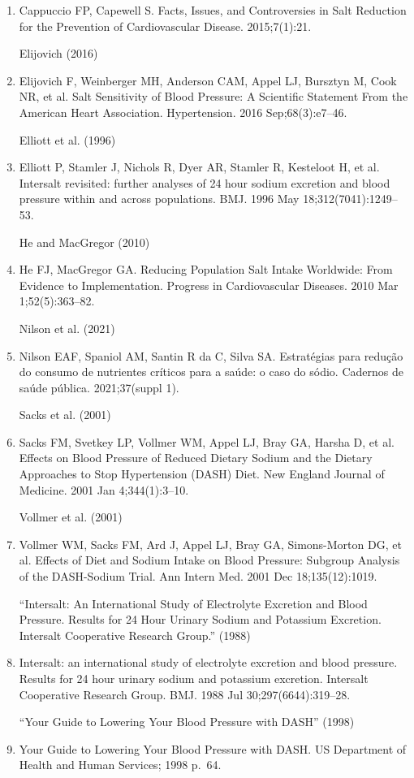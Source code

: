 \documentclass[
]{article}
\begin{document}
\begin{enumerate}
\def\labelenumi{\arabic{enumi}.}
\item
  Cappuccio FP, Capewell S. Facts, Issues, and Controversies in Salt
  Reduction for the Prevention of Cardiovascular Disease. 2015;7(1):21.

  Elijovich (2016)
\item
  Elijovich F, Weinberger MH, Anderson CAM, Appel LJ, Bursztyn M, Cook
  NR, et al. Salt Sensitivity of Blood Pressure: A Scientific Statement
  From the American Heart Association. Hypertension. 2016
  Sep;68(3):e7--46.

  Elliott et al. (1996)
\item
  Elliott P, Stamler J, Nichols R, Dyer AR, Stamler R, Kesteloot H, et
  al. Intersalt revisited: further analyses of 24 hour sodium excretion
  and blood pressure within and across populations. BMJ. 1996 May
  18;312(7041):1249--53.

  He and MacGregor (2010)
\item
  He FJ, MacGregor GA. Reducing Population Salt Intake Worldwide: From
  Evidence to Implementation. Progress in Cardiovascular Diseases. 2010
  Mar 1;52(5):363--82.

  Nilson et al. (2021)
\item
  Nilson EAF, Spaniol AM, Santin R da C, Silva SA. Estratégias para
  redução do consumo de nutrientes críticos para a saúde: o caso do
  sódio. Cadernos de saúde pública. 2021;37(suppl 1).

  Sacks et al. (2001)
\item
  Sacks FM, Svetkey LP, Vollmer WM, Appel LJ, Bray GA, Harsha D, et al.
  Effects on Blood Pressure of Reduced Dietary Sodium and the Dietary
  Approaches to Stop Hypertension (DASH) Diet. New England Journal of
  Medicine. 2001 Jan 4;344(1):3--10.

  Vollmer et al. (2001)
\item
  Vollmer WM, Sacks FM, Ard J, Appel LJ, Bray GA, Simons-Morton DG, et
  al. Effects of Diet and Sodium Intake on Blood Pressure: Subgroup
  Analysis of the DASH-Sodium Trial. Ann Intern Med. 2001 Dec
  18;135(12):1019.

  {``Intersalt: An International Study of Electrolyte Excretion and
  Blood Pressure. Results for 24 Hour Urinary Sodium and Potassium
  Excretion. Intersalt Cooperative Research Group.''} (1988)
\item
  Intersalt: an international study of electrolyte excretion and blood
  pressure. Results for 24 hour urinary sodium and potassium excretion.
  Intersalt Cooperative Research Group. BMJ. 1988 Jul
  30;297(6644):319--28.

  {``Your Guide to Lowering Your Blood Pressure with DASH''} (1998)
\item
  Your Guide to Lowering Your Blood Pressure with DASH. US Department of
  Health and Human Services; 1998 p.~64.
\end{enumerate}
\end{document}

